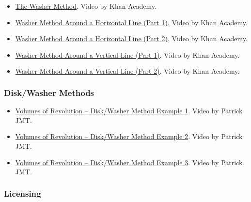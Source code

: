 \begin{itemize}
\item \href{https://www.youtube.com/watch?v=Thvc2s9aUP4}{The Washer Method}.  
Video by Khan Academy.

\item \href{https://www.youtube.com/watch?v=OFNGpKGg9IQ}{Washer Method Around a Horizontal Line (Part 1)}.  
Video by Khan Academy.

\item \href{https://www.youtube.com/watch?v=LKzpw_HUKNQ}{Washer Method Around a Horizontal Line (Part 2)}.  
Video by Khan Academy.

\item \href{https://www.youtube.com/watch?v=WAPZihVUmzE}{Washer Method Around a Vertical Line (Part 1)}.  
Video by Khan Academy.

\item \href{https://www.youtube.com/watch?v=i-Rb4_n929k}{Washer Method Around a Vertical Line (Part 2)}.  
Video by Khan Academy.

\end{itemize}

\subsubsection{Disk/Washer Methods}
\label{sss:thed-6219}

\begin{itemize}

\item \href{https://www.youtube.com/watch?v=E5OOMbz5jZk}{Volumes of Revolution – Disk/Washer Method Example 1}.  
Video by Patrick JMT.

\item \href{https://www.youtube.com/watch?v=ithgZfRKMHI}{Volumes of Revolution – Disk/Washer Method Example 2}.  
Video by Patrick JMT.

\item \href{https://www.youtube.com/watch?v=lE814ngFt3I}{Volumes of Revolution – Disk/Washer Method Example 3}.  
Video by Patrick JMT.

\end{itemize}

\subsubsection{Licensing}
\label{sss:lice-7352}

